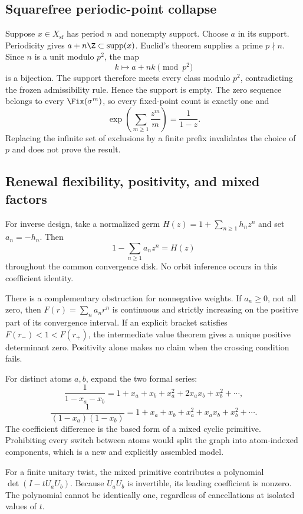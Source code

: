 \subsection{Squarefree periodic-point collapse}

Suppose \(x\in X_{\mathrm{sf}}\) has period \(n\) and nonempty support.
Choose \(a\) in its support.  Periodicity gives
\(a+n\Z\subset\operatorname{supp}(x)\).  Euclid's theorem supplies a prime
\(p\nmid n\).  Since \(n\) is a unit modulo \(p^2\), the map
\[
  k\longmapsto a+nk\pmod{p^2}
\]
is a bijection.  The support therefore meets every class modulo \(p^2\),
contradicting the frozen admissibility rule.  Hence the support is empty.
The zero sequence belongs to every \(\Fix(\sigma^m)\), so every fixed-point
count is exactly one and
\[
 \exp\left(\sum_{m\ge1}\frac{z^m}{m}\right)=\frac{1}{1-z}.
\]
Replacing the infinite set of exclusions by a finite prefix invalidates the
choice of \(p\) and does not prove the result.

\subsection{Renewal flexibility, positivity, and mixed factors}

For inverse design, take a normalized germ
\(H(z)=1+\sum_{n\ge1}h_nz^n\) and set \(a_n=-h_n\).  Then
\[
  1-\sum_{n\ge1}a_nz^n=H(z)
\]
throughout the common convergence disk.  No orbit inference occurs in this
coefficient identity.

There is a complementary obstruction for nonnegative weights.  If
\(a_n\ge0\), not all zero, then \(F(r)=\sum_n a_nr^n\) is continuous and
strictly increasing on the positive part of its convergence interval.  If an
explicit bracket satisfies \(F(r_-)<1<F(r_+)\), the intermediate value theorem
gives a unique positive determinant zero.  Positivity alone makes no claim
when the crossing condition fails.

For distinct atoms \(a,b\), expand the two formal series:
\[
  \frac{1}{1-x_a-x_b}
  =1+x_a+x_b+x_a^2+2x_ax_b+x_b^2+\cdots,
\]
\[
  \frac{1}{(1-x_a)(1-x_b)}
  =1+x_a+x_b+x_a^2+x_ax_b+x_b^2+\cdots.
\]
The coefficient difference is the based form of a mixed cyclic primitive.
Prohibiting every switch between atoms would split the graph into
atom-indexed components, which is a new and explicitly assembled model.

For a finite unitary twist, the mixed primitive contributes a polynomial
\(\det(I-tU_aU_b)\).  Because \(U_aU_b\) is invertible, its leading
coefficient is nonzero.  The polynomial cannot be identically one, regardless
of cancellations at isolated values of \(t\).

